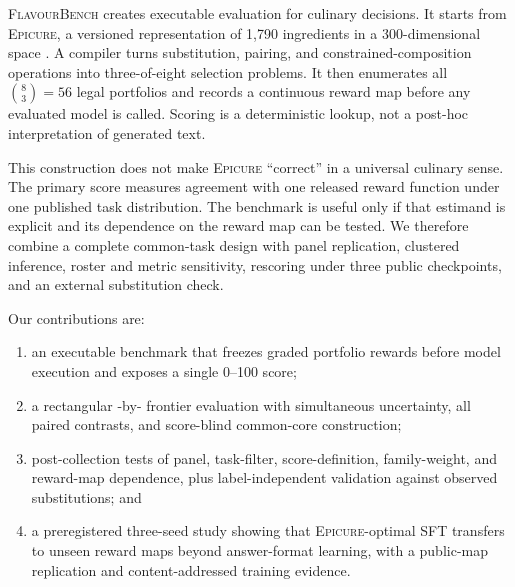 \documentclass{article}
\newcommand{\system}{\textsc{FlavourBench}}
\newcommand{\epicure}{\textsc{Epicure}}
\begin{document}
\system{} creates executable evaluation for culinary decisions. It starts from \epicure{}, a
versioned representation of 1,790 ingredients in a 300-dimensional space
\citep{radzikowski2026structure,radzikowski2026geometry}. A compiler turns substitution, pairing,
and constrained-composition operations into three-of-eight selection problems. It then enumerates
all $\binom{8}{3}=56$ legal portfolios and records a continuous reward map before any evaluated
model is called. Scoring is a deterministic lookup, not a post-hoc interpretation of generated
text.

This construction does not make \epicure{} ``correct'' in a universal culinary sense. The primary
score measures agreement with one released reward function under one published task distribution.
The benchmark is useful only if that estimand is explicit and its dependence on the reward map can
be tested. We therefore combine a complete common-task design with panel replication, clustered
inference, roster and metric sensitivity, rescoring under three public checkpoints, and an external
substitution check.

Our contributions are:
\begin{enumerate}[label=\arabic*.]
  \item an executable benchmark that freezes \FBPrefrozenScores{} graded portfolio rewards before
  model execution and exposes a single 0--100 score;
  \item a rectangular \FBModels{}-by-\FBTasks{} frontier evaluation with simultaneous uncertainty,
  all \FBPairs{} paired contrasts, and score-blind common-core construction;
  \item post-collection tests of panel, task-filter, score-definition, family-weight, and reward-map
  dependence, plus label-independent validation against observed substitutions; and
  \item a preregistered three-seed study showing that \epicure{}-optimal SFT transfers to unseen
  reward maps beyond answer-format learning, with a public-map replication and content-addressed
  training evidence.
\end{enumerate}
\end{document}
